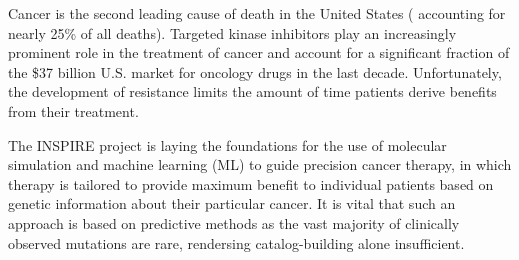 

Cancer is the second leading cause of death in the United States ( accounting
for nearly 25\% of all deaths). Targeted kinase inhibitors play an
increasingly prominent role in the treatment of cancer and account for a
significant fraction of the \$37 billion U.S. market for oncology drugs in the
last decade. Unfortunately, the development of resistance limits the amount of
time patients derive benefits from their treatment.


The INSPIRE project is laying the foundations for the use of molecular
simulation and machine learning (ML) to guide precision cancer therapy, in
which therapy is tailored to provide maximum benefit to individual patients
based on genetic information about their particular cancer. It is vital that
such an approach is based on predictive methods as the vast majority of
clinically observed mutations are rare, rendersing catalog-building alone
insufficient.
